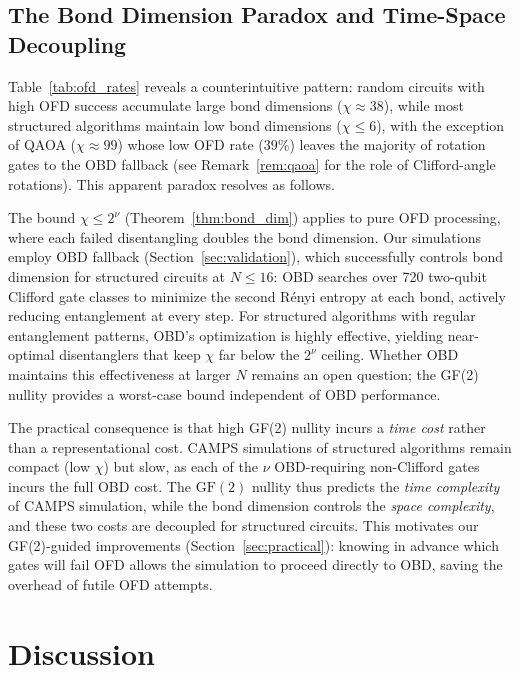 \documentclass[a4paper,twocolumn,11pt]{quantumarticle}
\begin{document}
\subsection{The Bond Dimension Paradox and Time-Space Decoupling}

Table~\ref{tab:ofd_rates} reveals a counterintuitive pattern: random circuits with high OFD success accumulate large bond dimensions ($\chi \approx 38$), while most structured algorithms maintain low bond dimensions ($\chi \le 6$), with the exception of QAOA ($\chi \approx 99$) whose low OFD rate ($39\%$) leaves the majority of rotation gates to the OBD fallback (see Remark~\ref{rem:qaoa} for the role of Clifford-angle rotations).
This apparent paradox resolves as follows.

The bound $\chi \le 2^\nu$ (Theorem~\ref{thm:bond_dim}) applies to pure OFD processing, where each failed disentangling doubles the bond dimension.
Our simulations employ OBD fallback (Section~\ref{sec:validation}), which successfully controls bond dimension for structured circuits at $N \le 16$: OBD searches over 720 two-qubit Clifford gate classes to minimize the second R\'enyi entropy at each bond, actively reducing entanglement at every step.
For structured algorithms with regular entanglement patterns, OBD's optimization is highly effective, yielding near-optimal disentanglers that keep $\chi$ far below the $2^\nu$ ceiling.
Whether OBD maintains this effectiveness at larger $N$ remains an open question; the GF(2) nullity provides a worst-case bound independent of OBD performance.

The practical consequence is that high GF(2) nullity incurs a \emph{time cost} rather than a representational cost.
CAMPS simulations of structured algorithms remain compact (low $\chi$) but slow, as each of the $\nu$ OBD-requiring non-Clifford gates incurs the full OBD cost.
The $\mathrm{GF}(2)$ nullity thus predicts the \emph{time complexity} of CAMPS simulation, while the bond dimension controls the \emph{space complexity}, and these two costs are decoupled for structured circuits.
This motivates our GF(2)-guided improvements (Section~\ref{sec:practical}): knowing in advance which gates will fail OFD allows the simulation to proceed directly to OBD, saving the overhead of futile OFD attempts.


\section{Discussion}
\label{sec:discussion}
\end{document}
